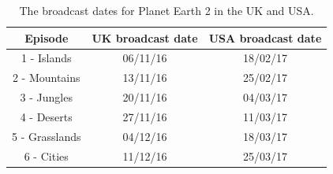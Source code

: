 \documentclass[12pt,letterpaper]{article}
\begin{document}
\begin{table}
\centering
\caption {The broadcast dates for Planet Earth 2 in the UK and USA.} \label{tab:dates} 
    \begin{tabular}{ccc}
    \hline
    Episode         & UK broadcast date & USA broadcast date \\ \hline
    1 - Islands     & 06/11/16          & 18/02/17           \\
    2 - Mountains   & 13/11/16          & 25/02/17           \\
    3 - Jungles     & 20/11/16          & 04/03/17           \\
    4 - Deserts     & 27/11/16          & 11/03/17           \\
    5 - Grasslands  & 04/12/16          & 18/03/17           \\
    6 - Cities      & 11/12/16          & 25/03/17           \\ \hline
    \end{tabular}
\end{table}





\end{document}
